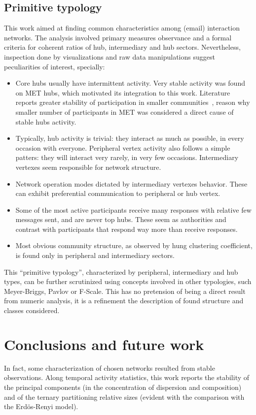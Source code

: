 \documentclass[%
 aip,
 jmp,%
 amsmath,amssymb,
 reprint,%
]{revtex4-1}
\begin{document}
    \subsection{Primitive typology}

This work aimed at finding common characteristics among (email) interaction networks. The analysis  involved primary measures observance and a formal criteria for coherent ratios of hub, intermediary and hub sectors. Nevertheless, inspection done by visualizations and raw data manipulations suggest peculiarities of interest, specially:

\begin{itemize}
    \item Core hubs usually have intermittent activity. Very stable activity was found on MET hubs, which motivated its integration to this work. Literature reports greater stability of participation in smaller communities~\cite{barabasiEvo}, reason why smaller number of participants in MET was considered a direct cause of stable hubs activity.
    \item Typically, hub activity is trivial: they interact as much as possible, in every occasion with everyone. Peripheral vertex activity also follows a simple patters: they will interact very rarely, in very few occasions. Intermediary vertexes seem responsible for network structure.
    \item Network operation modes dictated by intermediary vertexes behavior. These can exhibit preferential communication to peripheral or hub vertex.
    \item Some of the most active participants receive many responses with relative few messages sent, and are never top hubs. These seem as authorities and contrast with participants that respond way more than receive responses.
    \item Most obvious community structure, as observed by hung clustering coefficient, is found only in peripheral and intermediary sectors.
\end{itemize}

This ``primitive typology'', characterized by peripheral, intermediary and hub types, can be further scrutinized using concepts involved in other typologies, such Meyer-Briggs, Pavlov or F-Scale. This has no pretension of being a direct result from numeric analysis, it is a refinement the description of found structure and classes considered.

\section{Conclusions and future work}
In fact, some characterization of chosen networks resulted from stable observations. Along temporal activity statistics, this work reports the stability of the principal components (in the concentration of dispersion and composition) and of the ternary partitioning relative sizes (evident with the comparison with the Erd\"os-Renyi model).
\end{document}
